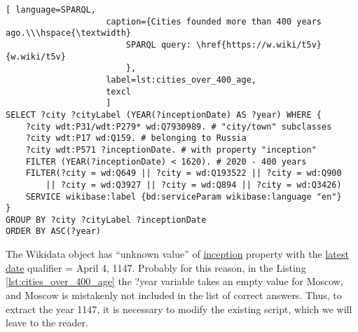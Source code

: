 \begin{lstlisting}[ language=SPARQL, 
                    caption={Cities founded more than 400 years ago.\\\hspace{\textwidth}
                        SPARQL query: \href{https://w.wiki/t5v}{w.wiki/t5v}
                        },
                    label=lst:cities_over_400_age,
                    texcl 
                    ]
SELECT ?city ?cityLabel (YEAR(?inceptionDate) AS ?year) WHERE {
	?city wdt:P31/wdt:P279* wd:Q7930989. # "city/town" subclasses
	?city wdt:P17 wd:Q159. # belonging to Russia
	?city wdt:P571 ?inceptionDate. # with property "inception"  
	FILTER (YEAR(?inceptionDate) < 1620). # 2020 - 400 years
	FILTER(?city = wd:Q649 || ?city = wd:Q193522 || ?city = wd:Q900
		|| ?city = wd:Q3927 || ?city = wd:Q894 || ?city = wd:Q3426)
	SERVICE wikibase:label {bd:serviceParam wikibase:language "en"}
}
GROUP BY ?city ?cityLabel ?inceptionDate
ORDER BY ASC(?year)
\end{lstlisting}%



The Wikidata object  has ``unknown value'' of \href{https://www.wikidata.org/wiki/Property:P571}{inception} property with the \href{https://www.wikidata.org/wiki/Property:P1326}{latest date} qualifier = April 4, 1147. Probably for this reason, in the Listing \ref{lst:cities_over_400_age} the ?year variable takes an empty value for Moscow, and Moscow is mistakenly not included in the list of correct answers. Thus, to extract the year 1147, it is necessary to modify the existing script, which we will leave to the reader.


